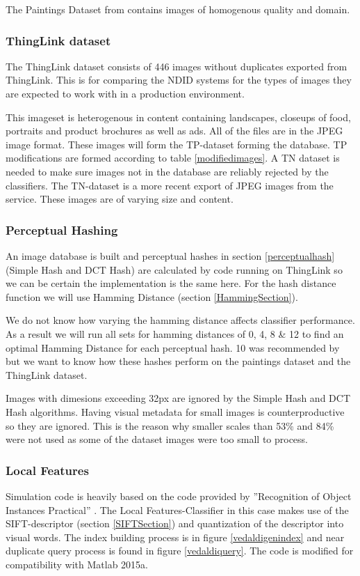 \documentclass[english,12pt,a4paper,pdftex,elec,utf8]{aaltothesis}
\begin{document}
The Paintings Dataset from \cite{Vedaldi2012} contains images of homogenous quality and domain.

\subsubsection{ThingLink dataset}
The ThingLink dataset consists of 446 images without duplicates exported from ThingLink. This is for comparing the NDID systems for the types of images they are expected to work with in a production environment.

This imageset is heterogenous in content containing landscapes, closeups of food, portraits and product brochures as well as ads. All of the files are in the JPEG image format. These images will form the TP-dataset forming the database. TP modifications are formed according to table \ref{modifiedimages}. A TN dataset is needed to make sure images not in the database are reliably rejected by the classifiers. The TN-dataset is a more recent export of JPEG images from the service. These images are of varying size and content.

\subsubsection{Perceptual Hashing}
An image database is built and perceptual hashes in section \ref{perceptualhash} (Simple Hash and DCT Hash) are calculated by code running on ThingLink so we can be certain the implementation is the same here. For the hash distance function we will use Hamming Distance (section \ref{HammingSection}).

We do not know how varying the hamming distance affects classifier performance. As a result we will run all sets for hamming distances of 0, 4, 8 \& 12 to find an optimal Hamming Distance for each perceptual hash. 10 was recommended by \cite{Zauner2010} but we want to know how these hashes perform on the paintings dataset and the ThingLink dataset.

Images with dimesions exceeding 32px are ignored by the Simple Hash and DCT Hash algorithms. Having visual metadata for small images is counterproductive so they are ignored. This is the reason why smaller scales than 53\% and 84\% were not used as some of the dataset images were too small to process.

\subsubsection{Local Features}
Simulation code is heavily based on the code provided by ''Recognition of Object Instances Practical'' \cite{Vedaldi2012}. The Local Features-Classifier in this case makes use of the SIFT-descriptor (section \ref{SIFTSection}) and quantization of the descriptor into visual words. The index building process is in figure \ref{vedaldigenindex} and near duplicate query process is found in figure \ref{vedaldiquery}. The code is modified for compatibility with Matlab 2015a.
\end{document}
